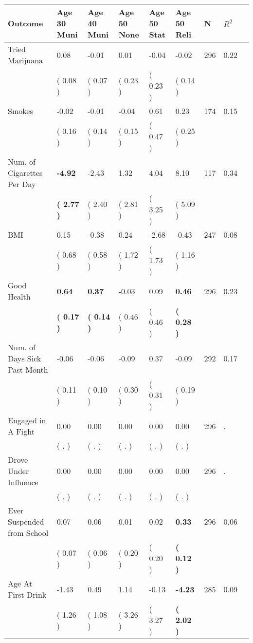 \begin{tabular}{L{6.2cm} C{1.8cm} C{1.8cm} C{1.8cm} C{1.8cm} C{1.8cm} C{1.8cm} C{0.3cm} C{0.3cm}}
\toprule
 \textbf{Outcome} & \textbf{Age 30 Muni} & \textbf{Age 40 Muni} & \textbf{Age 50 None} & \textbf{Age 50 Stat} & \textbf{Age 50 Reli} & \textbf{N} & \textbf{$ R^2$} \\
\midrule
Tried Marijuana &      0.08 &     -0.01 &      0.01 &     -0.04 &     -0.02  & 296 &       0.22 \\ 
 & (     0.08 ) & (     0.07 ) & (     0.23 ) & (     0.23 ) & (     0.14 )  & \\
Smokes &     -0.02 &     -0.01 &     -0.04 &      0.61 &      0.23  & 174 &       0.15 \\ 
 & (     0.16 ) & (     0.14 ) & (     0.15 ) & (     0.47 ) & (     0.25 )  & \\
Num. of Cigarettes Per Day & \textbf{    -4.92} &     -2.43 &      1.32 &      4.04 &      8.10  & 117 &       0.34 \\ 
 & \textbf{(     2.77 )} & (     2.40 ) & (     2.81 ) & (     3.25 ) & (     5.09 )  & \\
BMI &      0.15 &     -0.38 &      0.24 &     -2.68 &     -0.43  & 247 &       0.08 \\ 
 & (     0.68 ) & (     0.58 ) & (     1.72 ) & (     1.73 ) & (     1.16 )  & \\
Good Health & \textbf{     0.64} & \textbf{     0.37} &     -0.03 &      0.09 & \textbf{     0.46}  & 296 &       0.23 \\ 
 & \textbf{(     0.17 )} & \textbf{(     0.14 )} & (     0.46 ) & (     0.46 ) & \textbf{(     0.28 )}  & \\
Num. of Days Sick Past Month &     -0.06 &     -0.06 &     -0.09 &      0.37 &     -0.09  & 292 &       0.17 \\ 
 & (     0.11 ) & (     0.10 ) & (     0.30 ) & (     0.31 ) & (     0.19 )  & \\
Engaged in A Fight &      0.00 &      0.00 &      0.00 &      0.00 &      0.00  & 296 &          . \\ 
 & (        . ) & (        . ) & (        . ) & (        . ) & (        . )  & \\
Drove Under Influence &      0.00 &      0.00 &      0.00 &      0.00 &      0.00  & 296 &          . \\ 
 & (        . ) & (        . ) & (        . ) & (        . ) & (        . )  & \\
Ever Suspended from School &      0.07 &      0.06 &      0.01 &      0.02 & \textbf{     0.33}  & 296 &       0.06 \\ 
 & (     0.07 ) & (     0.06 ) & (     0.20 ) & (     0.20 ) & \textbf{(     0.12 )}  & \\
Age At First Drink &     -1.43 &      0.49 &      1.14 &     -0.13 & \textbf{    -4.23}  & 285 &       0.09 \\ 
 & (     1.26 ) & (     1.08 ) & (     3.26 ) & (     3.27 ) & \textbf{(     2.02 )}  & \\
\bottomrule
\end{tabular}
